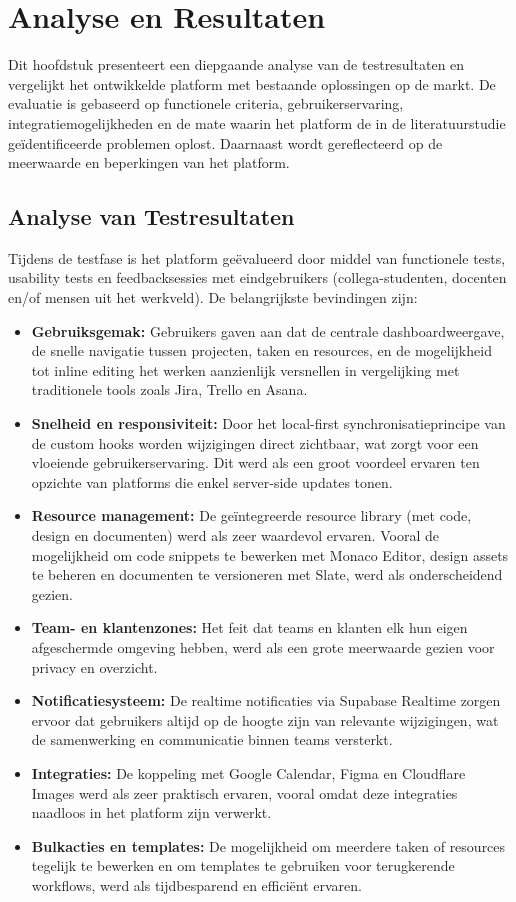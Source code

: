 \chapter{Analyse en Resultaten}
\label{ch:analyse}

Dit hoofdstuk presenteert een diepgaande analyse van de testresultaten en vergelijkt het ontwikkelde platform met bestaande oplossingen op de markt. De evaluatie is gebaseerd op functionele criteria, gebruikerservaring, integratiemogelijkheden en de mate waarin het platform de in de literatuurstudie geïdentificeerde problemen oplost. Daarnaast wordt gereflecteerd op de meerwaarde en beperkingen van het platform.

\section{Analyse van Testresultaten}
\label{sec:analyse-resultaten}

Tijdens de testfase is het platform geëvalueerd door middel van functionele tests, usability tests en feedbacksessies met eindgebruikers (collega-studenten, docenten en/of mensen uit het werkveld). De belangrijkste bevindingen zijn:

\begin{itemize}
    \item \textbf{Gebruiksgemak:} Gebruikers gaven aan dat de centrale dashboardweergave, de snelle navigatie tussen projecten, taken en resources, en de mogelijkheid tot inline editing het werken aanzienlijk versnellen in vergelijking met traditionele tools zoals Jira, Trello en Asana.
    \item \textbf{Snelheid en responsiviteit:} Door het local-first synchronisatieprincipe van de custom hooks worden wijzigingen direct zichtbaar, wat zorgt voor een vloeiende gebruikerservaring. Dit werd als een groot voordeel ervaren ten opzichte van platforms die enkel server-side updates tonen.
    \item \textbf{Resource management:} De geïntegreerde resource library (met code, design en documenten) werd als zeer waardevol ervaren. Vooral de mogelijkheid om code snippets te bewerken met Monaco Editor, design assets te beheren en documenten te versioneren met Slate, werd als onderscheidend gezien.
    \item \textbf{Team- en klantenzones:} Het feit dat teams en klanten elk hun eigen afgeschermde omgeving hebben, werd als een grote meerwaarde gezien voor privacy en overzicht.
    \item \textbf{Notificatiesysteem:} De realtime notificaties via Supabase Realtime zorgen ervoor dat gebruikers altijd op de hoogte zijn van relevante wijzigingen, wat de samenwerking en communicatie binnen teams versterkt.
    \item \textbf{Integraties:} De koppeling met Google Calendar, Figma en Cloudflare Images werd als zeer praktisch ervaren, vooral omdat deze integraties naadloos in het platform zijn verwerkt.
    \item \textbf{Bulkacties en templates:} De mogelijkheid om meerdere taken of resources tegelijk te bewerken en om templates te gebruiken voor terugkerende workflows, werd als tijdbesparend en efficiënt ervaren.
\end{itemize}

